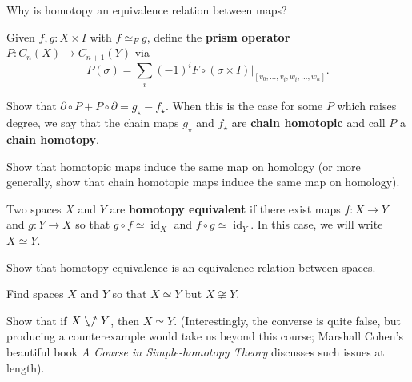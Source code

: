 \documentclass[12pt]{pset}
\newcommand{\she}{\ssearrow\nnearrow}
\DeclareMathOperator{\id}{id}
\begin{document}
\begin{problem}
  Why is homotopy an equivalence relation between maps?%
\end{problem}

\begin{definition*}
  Given $f, g : X \times I$ with $f \simeq_F g$, define the \textbf{prism
    operator} $P : C_n(X) \to C_{n+1}(Y)$ via
  $$
  P(\sigma) = \sum_i (-1)^i F \circ (\sigma \times I)
  |_{[v_0,\ldots,v_i,w_i,\ldots, w_n]}.
  $$
\end{definition*}

\begin{problem}
  Show that $\partial \circ P + P \circ \partial = g_\star - f_\star$.
  When this is the case for some $P$ which raises degree, we say that
  the chain maps $g_\star$ and $f_\star$ are \textbf{chain homotopic}
  and call $P$ a \textbf{chain homotopy}.
\end{problem}

\begin{requiredproblem}
  Show that homotopic maps induce the same map on homology (or more
  generally, show that chain homotopic maps induce the same map on
  homology).
\end{requiredproblem}

\begin{definition*}
  Two spaces $X$ and $Y$ are \textbf{homotopy equivalent} if there
  exist maps $f : X \to Y$ and $g : Y \to X$ so that $g \circ f \simeq
  \id_X$ and $f \circ g \simeq \id_Y$.  In this case, we will write $X
  \simeq Y$.
\end{definition*}

\begin{problem}
  Show that homotopy equivalence is an equivalence relation between spaces.
\end{problem}



\begin{requiredproblem}
  Find spaces $X$ and $Y$ so that $X \simeq Y$ but $X \not\cong Y$.
\end{requiredproblem}

\begin{problem}
  Show that if $X \she Y$, then $X \simeq Y$.  (Interestingly, the
  converse is quite false, but producing a counterexample would take us
  beyond this course; Marshall Cohen's beautiful book \textit{A Course
    in Simple-homotopy Theory} discusses such issues at length).
\end{problem}
\end{document}
